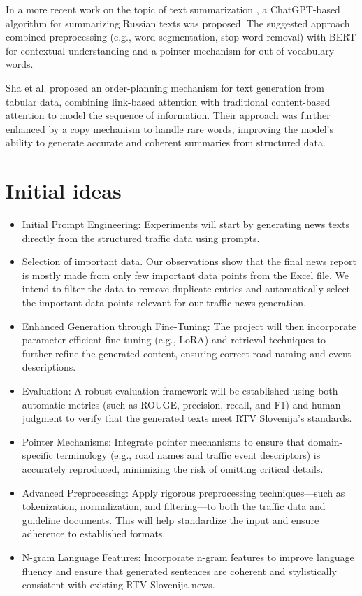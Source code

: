 \documentclass[fleqn,moreauthors,10pt]{ds_report}
\begin{document}
In a more recent work on the topic of text summarization \cite{houAlgorithmAutomaticAbstract2024}, a ChatGPT-based
algorithm for summarizing Russian texts was proposed. The suggested approach combined preprocessing (e.g., word segmentation,
stop word removal) with BERT for contextual understanding and a pointer mechanism for out-of-vocabulary
words.

Sha et al. \cite{sha2018order} proposed an order-planning mechanism for text generation from tabular data, combining
link-based attention with traditional content-based attention to model the sequence of information. Their approach
was further enhanced by a copy mechanism to handle rare words, improving the model's ability to generate accurate
and coherent summaries from structured data.

\section{Initial ideas}
\begin{itemize}
    \item Initial Prompt Engineering: Experiments will start by generating news texts directly from the structured traffic data using prompts.
    
    \item Selection of important data. Our observations show that the final news report is mostly made from only few important data points from the Excel file. We intend to filter the data to remove duplicate entries and automatically select the important data points relevant for our traffic news generation.
    
    \item Enhanced Generation through Fine-Tuning: The project will then incorporate parameter-efficient fine-tuning (e.g., LoRA) and retrieval techniques to further refine the generated content, ensuring correct road naming and event descriptions.
    
    \item Evaluation: A robust evaluation framework will be established using both automatic metrics (such as ROUGE, precision, recall, and F1) and human judgment to verify that the generated texts meet RTV Slovenija's standards.

    \item Pointer Mechanisms: Integrate pointer mechanisms to ensure that domain-specific terminology (e.g., road names and traffic event descriptors) is accurately reproduced, minimizing the risk of omitting critical details.

    \item Advanced Preprocessing: Apply rigorous preprocessing techniques—such as tokenization, normalization, and filtering—to both the traffic data and guideline documents. This will help standardize the input and ensure adherence to established formats.

    \item N-gram Language Features: Incorporate n-gram features to improve language fluency and ensure that generated sentences are coherent and stylistically consistent with existing RTV Slovenija news.

    \end{itemize}
\end{document}
